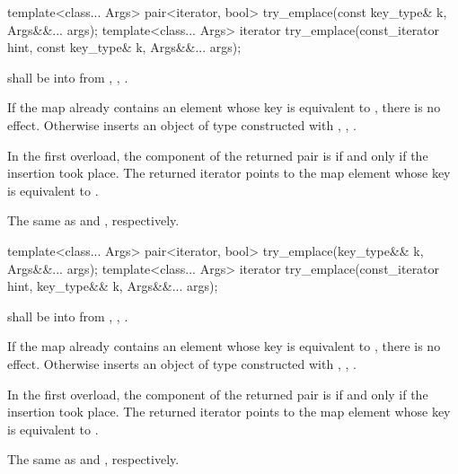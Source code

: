 %
\begin{itemdecl}
template<class... Args>
  pair<iterator, bool> try_emplace(const key_type& k, Args&&... args);
template<class... Args>
  iterator try_emplace(const_iterator hint, const key_type& k, Args&&... args);
\end{itemdecl}

\begin{itemdescr}
\pnum
\requires
{} shall be  into 
from , ,
.

\pnum
\effects
If the map already contains an element
whose key is equivalent to ,
there is no effect.
Otherwise inserts an object of type 
constructed with , ,
.

\pnum
\returns
In the first overload,
the  component of the returned pair is 
if and only if the insertion took place.
The returned iterator points to the map element
whose key is equivalent to .

\pnum
\complexity
The same as  and ,
respectively.
\end{itemdescr}

%
\begin{itemdecl}
template<class... Args>
  pair<iterator, bool> try_emplace(key_type&& k, Args&&... args);
template<class... Args>
  iterator try_emplace(const_iterator hint, key_type&& k, Args&&... args);
\end{itemdecl}

\begin{itemdescr}
\pnum
\requires
{} shall be  into 
from , ,
.

\pnum
\effects
If the map already contains an element
whose key is equivalent to ,
there is no effect.
Otherwise inserts an object of type 
constructed with , ,
.

\pnum
\returns
In the first overload,
the  component of the returned pair is 
if and only if the insertion took place.
The returned iterator points to the map element
whose key is equivalent to .

\pnum
\complexity
The same as  and ,
respectively.
\end{itemdescr}

